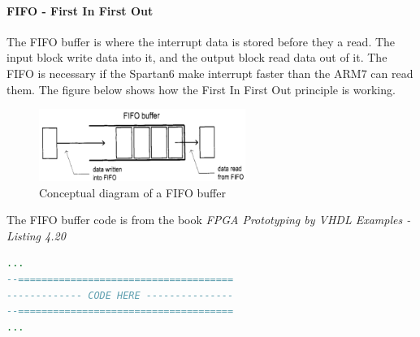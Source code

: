 \paragraph{FIFO - First In First Out}
The FIFO buffer is where the interrupt data is stored before they a read. The input block write data into it, and the output block read data out of it. The FIFO is necessary if the Spartan6 make interrupt faster than the ARM7 can read them. The figure below shows how the First In First Out principle is working.
\begin{figure}[H]
	\begin{centering}
		\includegraphics[width=0.6\textwidth]{images/tb5_fifo.png}
		\caption{Conceptual diagram of a FIFO buffer}
	\end{centering}
\end{figure}
The FIFO buffer code is from the book \textit{FPGA Prototyping by VHDL Examples - Listing 4.20}
\begin{lstlisting}[language=VHDL]
...
--=====================================
------------- CODE HERE ---------------
--=====================================
...
\end{lstlisting}
